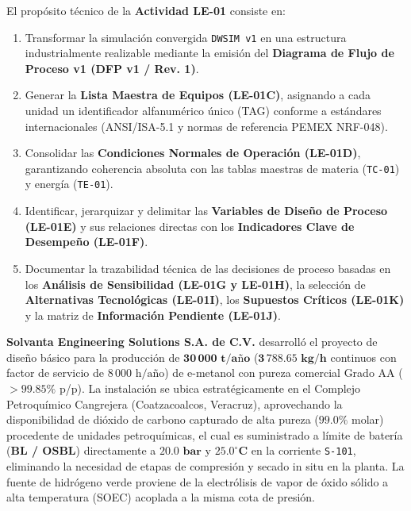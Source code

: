\documentclass[10pt,letterpaper]{article}
\begin{document}
\begin{propositobox}
El propósito técnico de la \textbf{Actividad LE-01} consiste en:
\begin{enumerate}[leftmargin=*]
    \item Transformar la simulación convergida \texttt{DWSIM v1} en una estructura industrialmente realizable mediante la emisión del \textbf{Diagrama de Flujo de Proceso v1 (DFP v1 / Rev. 1)}.
    \item Generar la \textbf{Lista Maestra de Equipos (LE-01C)}, asignando a cada unidad un identificador alfanumérico único (TAG) conforme a estándares internacionales (ANSI/ISA-5.1 y normas de referencia PEMEX NRF-048).
    \item Consolidar las \textbf{Condiciones Normales de Operación (LE-01D)}, garantizando coherencia absoluta con las tablas maestras de materia (\texttt{TC-01}) y energía (\texttt{TE-01}).
    \item Identificar, jerarquizar y delimitar las \textbf{Variables de Diseño de Proceso (LE-01E)} y sus relaciones directas con los \textbf{Indicadores Clave de Desempeño (LE-01F)}.
    \item Documentar la trazabilidad técnica de las decisiones de proceso basadas en los \textbf{Análisis de Sensibilidad (LE-01G y LE-01H)}, la selección de \textbf{Alternativas Tecnológicas (LE-01I)}, los \textbf{Supuestos Críticos (LE-01K)} y la matriz de \textbf{Información Pendiente (LE-01J)}.
\end{enumerate}
\end{propositobox}

\textbf{Solvanta Engineering Solutions S.A. de C.V.} desarrolló el proyecto de diseño básico para la producción de $\mathbf{30\,000\text{ t/año}}$ ($\mathbf{3\,788.65\text{ kg/h}}$ continuos con factor de servicio de $8\,000\text{ h/año}$) de e-metanol con pureza comercial Grado AA ($>99.85\%$ p/p). La instalación se ubica estratégicamente en el Complejo Petroquímico Cangrejera (Coatzacoalcos, Veracruz), aprovechando la disponibilidad de dióxido de carbono capturado de alta pureza ($99.0\%$ molar) procedente de unidades petroquímicas, el cual es suministrado a límite de batería (\textbf{BL / OSBL}) directamente a $\mathbf{20.0\text{ bar}}$ y $\mathbf{25.0^\circ\text{C}}$ en la corriente \texttt{S-101}, eliminando la necesidad de etapas de compresión y secado in situ en la planta. La fuente de hidrógeno verde proviene de la electrólisis de vapor de óxido sólido a alta temperatura (SOEC) acoplada a la misma cota de presión.
\end{document}
